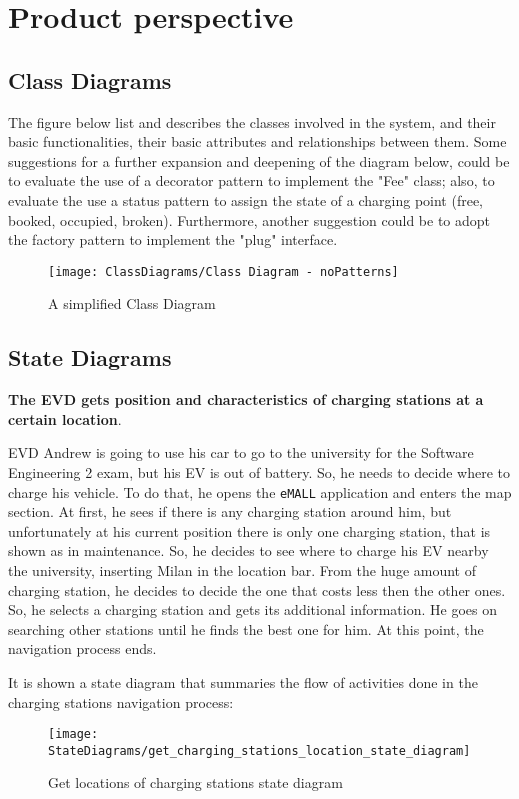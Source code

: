 \section{Product perspective}\label{sec:product_perspective}
\subsection{Class Diagrams}\label{subsec:class-diagrams}
The figure below list and describes the classes involved in the system, and their basic functionalities, their basic attributes and relationships between them. Some suggestions for a further expansion and deepening of the diagram below, could be to evaluate the use of a decorator pattern to implement the "Fee" class; also, to evaluate the use a status pattern to assign the state of a charging point (free, booked, occupied, broken). Furthermore, another suggestion could be to adopt the factory pattern to implement the "plug" interface.
\begin{figure}[H]
	\centering
	\texttt{[image: ClassDiagrams/Class Diagram - noPatterns]}
	\caption{A simplified Class Diagram}
	\label{fig: class_diagram}
\end{figure}

\subsection{State Diagrams}\label{subsec:state-diagrams}
\textbf{The EVD gets position and characteristics of charging stations at a certain location}.

EVD Andrew is going to use his car to go to the university for the Software Engineering 2 exam, but his EV is out of battery.
So, he needs to decide where to charge his vehicle.
To do that, he opens the \verb|eMALL| application and enters the map section.
At first, he sees if there is any charging station around him, but unfortunately at his current position there is only
one charging station, that is shown as in maintenance.
So, he decides to see where to charge his EV nearby the university, inserting Milan in the location bar.
From the huge amount of charging station, he decides to decide the one that costs less then the other ones.
So, he selects a charging station and gets its additional information.
He goes on searching other stations until he finds the best one for him.
At this point, the navigation process ends.

It is shown a state diagram that summaries the flow of activities done in the charging stations navigation process:
\begin{figure}[H]
    \centering
    \texttt{[image: StateDiagrams/get\_charging\_stations\_location\_state\_diagram]}
    \caption{Get locations of charging stations state diagram}
    \label{fig: locations_sd}
\end{figure}

